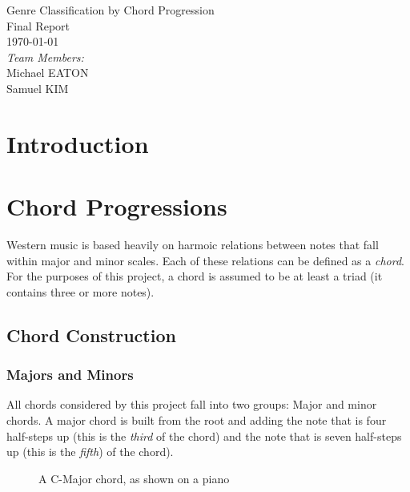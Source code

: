 \documentclass{article}
\begin{document}
\fancyhf{}
\rhead{\today}

\begin{titlepage}
\begin{center}
{\huge Genre Classification by Chord Progression}\\[2cm]
{\Large Final Report}\\[2cm]
{\large \today}\\[2cm]
\emph{Team Members:}\\
Michael \uppercase{Eaton}\\
Samuel \uppercase{Kim}\\
\end{center}
\end{titlepage}

\tableofcontents
\newpage

\section{Introduction}

\newpage

\section{Chord Progressions}
Western music is based heavily on harmoic relations between notes 
that fall within major and minor scales. Each of these relations can be 
defined as a \emph{chord}.  For the purposes of this project, a chord 
is assumed to be at least a triad (it contains three or more notes).

	\subsection{Chord Construction}
	
		\subsubsection{Majors and Minors}
		All chords considered by this project fall into two groups:  Major 
		and minor chords.  A major chord is built from the root and adding 
		the note that is four half-steps up (this is the \emph{third} of the 
		chord) and the note that is seven half-steps up (this is the \emph{fifth}) 
		of the chord).

		\begin{figure}[htb]
		\caption{A  C-Major chord, as shown on a piano}
		\end{figure} 
\end{document}
